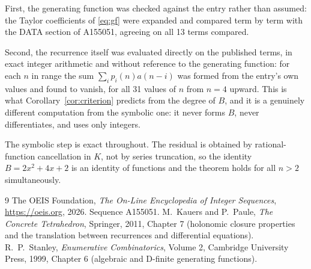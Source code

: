 \documentclass[11pt,a4paper]{article}
\theoremstyle{plain}
\theoremstyle{definition}
\begin{document}
First, the generating function was checked against the entry rather than assumed: the
Taylor coefficients of \eqref{eq:gf} were expanded and compared term by term with the DATA
section of A155051, agreeing on all 13 terms compared.

Second, the recurrence itself was evaluated directly on the published terms, in exact
integer arithmetic and without reference to the generating function: for each $n$ in range
the sum $\sum_{i}p_{i}(n)a(n-i)$ was formed from the entry's own values and found to
vanish, for all 31 values of $n$ from $n=4$ upward. This is what
Corollary~\ref{cor:criterion} predicts from the degree of $B$, and it is a genuinely
different computation from the symbolic one: it never forms $B$, never differentiates, and
uses only integers.

The symbolic step is exact throughout. The residual is obtained by rational-function
cancellation in $K$, not by series truncation, so the identity $B=2 x^{2} + 4 x + 2$ is an
identity of functions and the theorem holds for all $n>2$ simultaneously.

\begin{thebibliography}{9}
 The OEIS Foundation, \emph{The On-Line Encyclopedia of Integer Sequences},
\url{https://oeis.org}, 2026. Sequence A155051.
 M.~Kauers and P.~Paule, \emph{The Concrete Tetrahedron}, Springer, 2011,
Chapter 7 (holonomic closure properties and the translation between recurrences and
differential equations).
 R.~P.~Stanley, \emph{Enumerative Combinatorics}, Volume 2, Cambridge
University Press, 1999, Chapter 6 (algebraic and D-finite generating functions).
\end{thebibliography}
\end{document}
